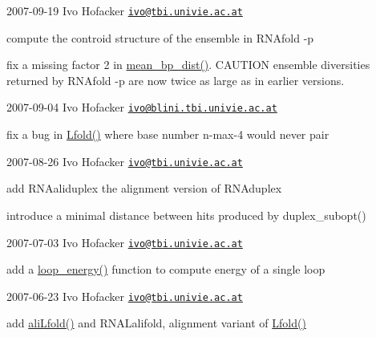 2007-\/09-\/19 Ivo Hofacker \href{mailto:ivo@tbi.univie.ac.at}{\tt ivo@tbi.\+univie.\+ac.\+at}


\begin{DoxyItemize}
\item compute the controid structure of the ensemble in R\+N\+Afold -\/p
\item fix a missing factor 2 in \hyperlink{part__func_8h_ae9556ba7ded44fe2321b6f67c3fc02a3}{mean\+\_\+bp\+\_\+dist()}. C\+A\+U\+T\+I\+ON ensemble diversities returned by R\+N\+Afold -\/p are now twice as large as in earlier versions.
\end{DoxyItemize}

2007-\/09-\/04 Ivo Hofacker \href{mailto:ivo@blini.tbi.univie.ac.at}{\tt ivo@blini.\+tbi.\+univie.\+ac.\+at}


\begin{DoxyItemize}
\item fix a bug in \hyperlink{group__local__mfe__fold_ga16e5a70e60835bb969eaecbe6482f1be}{Lfold()} where base number n-\/max-\/4 would never pair
\end{DoxyItemize}

2007-\/08-\/26 Ivo Hofacker \href{mailto:ivo@tbi.univie.ac.at}{\tt ivo@tbi.\+univie.\+ac.\+at}


\begin{DoxyItemize}
\item add R\+N\+Aaliduplex the alignment version of R\+N\+Aduplex
\item introduce a minimal distance between hits produced by duplex\+\_\+subopt()
\end{DoxyItemize}

2007-\/07-\/03 Ivo Hofacker \href{mailto:ivo@tbi.univie.ac.at}{\tt ivo@tbi.\+univie.\+ac.\+at}


\begin{DoxyItemize}
\item add a \hyperlink{group__eval_ga507d4fd93f4b398d793ba2402731388d}{loop\+\_\+energy()} function to compute energy of a single loop
\end{DoxyItemize}

2007-\/06-\/23 Ivo Hofacker \href{mailto:ivo@tbi.univie.ac.at}{\tt ivo@tbi.\+univie.\+ac.\+at}


\begin{DoxyItemize}
\item add \hyperlink{group__local__consensus__fold_ga864db0f9c428356d978ad0600aa9a8bc}{ali\+Lfold()} and R\+N\+A\+Lalifold, alignment variant of \hyperlink{group__local__mfe__fold_ga16e5a70e60835bb969eaecbe6482f1be}{Lfold()}
\end{DoxyItemize}

